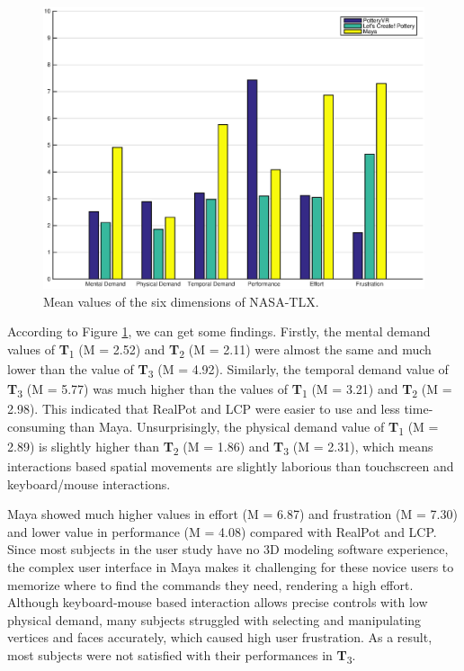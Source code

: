 \documentclass{svjour3}                     %
\begin{document}
\begin{figure}
	\includegraphics[width=\textwidth]{fig14.eps}
	\caption{Mean values of the six dimensions of NASA-TLX.}
	\label{fig:tlx}
\end{figure}

According to Figure \ref{fig:tlx}, we can get some findings. 
Firstly, the mental demand values of \textbf{T}\textsubscript{1} (M = 2.52) and \textbf{T}\textsubscript{2} (M = 2.11) were almost the same and much lower than the value of \textbf{T}\textsubscript{3} (M = 4.92). Similarly, the temporal demand value of \textbf{T}\textsubscript{3} (M = 5.77) was much higher than the values of \textbf{T}\textsubscript{1} (M = 3.21) and \textbf{T}\textsubscript{2} (M = 2.98). This indicated that RealPot and LCP were easier to use and less time-consuming than Maya. Unsurprisingly, the physical demand value of \textbf{T}\textsubscript{1} (M = 2.89) is slightly higher than \textbf{T}\textsubscript{2} (M = 1.86) and \textbf{T}\textsubscript{3} (M = 2.31), which means interactions based spatial movements are slightly laborious than touchscreen and keyboard/mouse interactions.

Maya showed much higher values in effort (M = 6.87) and frustration (M = 7.30) and lower value in performance (M = 4.08) compared with RealPot and LCP.
Since most subjects in the user study have no 3D modeling software experience, the complex user interface in Maya makes it challenging for these novice users to memorize where to find the commands they need, rendering a high effort.
Although keyboard-mouse based interaction allows precise controls with low physical demand, many subjects struggled with selecting and manipulating vertices and faces accurately, which caused high user frustration. As a result, most subjects were not satisfied with their performances in \textbf{T}\textsubscript{3}.
\end{document}
